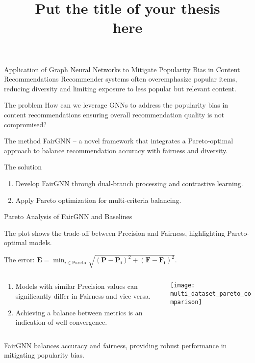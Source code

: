 \documentclass[10pt,pdf,hyperref={unicode}]{beamer}
\title{ Put the title of your thesis \\ here}
\begin{document}
\setcounter{page}{2}%
\begin{frame}{Application of Graph Neural Networks to Mitigate Popularity Bias in Content Recommendations}
    Recommender systems often overemphasize popular items, reducing diversity and limiting exposure to less popular but relevant content.

    \begin{block}{The problem}
        How can we leverage GNNs to address the popularity bias in content recommendations ensuring overall recommendation quality
        is not compromised?
    \end{block}

    \begin{block}{The method}
        FairGNN – a novel framework that integrates a Pareto-optimal approach to balance recommendation accuracy with fairness and diversity.
    \end{block}

    \begin{block}{The solution}
        \begin{enumerate}[1]
            \item Develop FairGNN through dual-branch processing and contrastive learning.
            \item Apply Pareto optimization for multi-criteria balancing.
        \end{enumerate}
    \end{block}
\end{frame}
\begin{frame}{Pareto Analysis of FairGNN and Baselines}

The plot shows the trade-off between Precision and Fairness, highlighting Pareto-optimal models. 

The error: $\scriptstyle{\mathbf{E} = \min_{i \in \text{Pareto}} \sqrt{(\mathbf{P} - \mathbf{P_i})^2 + (\mathbf{F} - \mathbf{F_i})^2}}$.

\begin{columns}
    \begin{column}{0.3\textwidth}
        \begin{enumerate}[1]
            \item Models with similar Precision values can significantly differ in Fairness and vice versa.
            \item Achieving a balance between metrics is an indication of well convergence.
        \end{enumerate}
    \end{column}
    \begin{column}{0.8\textwidth}
	    \texttt{[image: multi\_dataset\_pareto\_comparison]}      
    \end{column}
\end{columns}

\bigskip

FairGNN balances accuracy and fairness, providing robust performance in mitigating popularity bias.
\end{frame}
\end{document}
